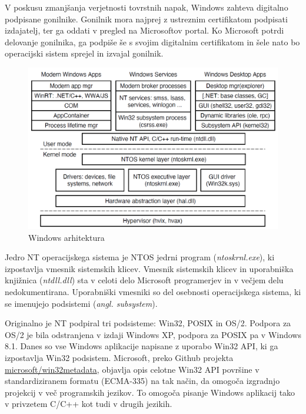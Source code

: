 \documentclass[a4paper,12pt,openright]{book}
\begin{document}
V poskusu zmanjšanja verjetnosti tovrstnih napak, Windows zahteva digitalno podpisane gonilnike.
Gonilnik mora najprej z ustreznim certifikatom podpisati izdajatelj, ter ga oddati v pregled na Microsoftov portal.
Ko Microsoft potrdi delovanje gonilnika, ga podpiše še s svojim digitalnim certifikatom in šele nato bo operacijski sistem sprejel in izvajal gonilnik.
\cite{Yosifovich_Russinovich_Solomon_Ionescu_2017}

\begin{figure}[h!]
	\begin{center}
		\includegraphics[width=\textwidth]{images/windows_programming_layers.png}
	\end{center}
	\caption{Windows arhitektura \cite{Tanenbaum_Bos_2023}}
	\label{fig:windows_architecture}
\end{figure}

Jedro NT operacijskega sistema je NTOS jedrni program (\textit{ntoskrnl.exe}), ki izpostavlja vmesnik sistemskih klicev.
Vmesnik sistemskih klicev in uporabniška knjižnica (\textit{ntdll.dll}) sta v celoti delo Microsoft programerjev in v večjem delu nedokumentirana.
Uporabniški vmesniki so del osebnosti operacijskega sistema, ki se imenujejo podsistemi (\textit{angl. subsystem}).

Originalno je NT podpiral tri podsisteme: Win32, POSIX in OS/2.
Podpora za OS/2 je bila odstranjena v izdaji Windows XP, podpora za POSIX pa v Windows 8.1.
Danes so vse Windows aplikacije napisane z uporabo Win32 API, ki ga izpostavlja Win32 podsistem.
Microsoft, preko Github projekta \href{https://github.com/microsoft/win32metadata}{microsoft/win32metadata}, objavlja opis celotne Win32 API površine v standardiziranem formatu (ECMA-335) na tak način, da omogoča izgradnjo projekcij v več programskih jezikov.
To omogoča pisanje Windows aplikacij tako v privzetem C/C++ kot tudi v drugih jezikih.
\cite{Tanenbaum_Bos_2023}
\end{document}
